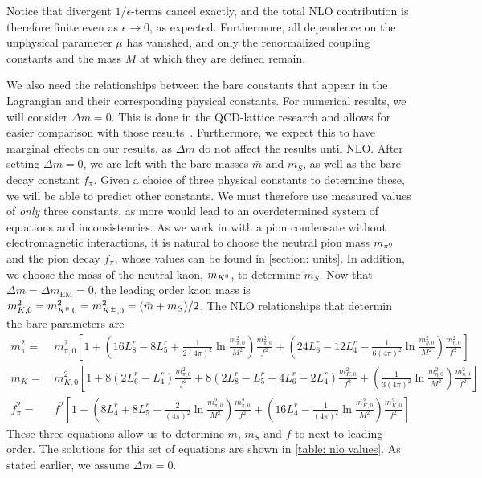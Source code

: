 Notice that divergent $1/\epsilon$-terms cancel exactly, and the total NLO contribution is therefore finite even as $\epsilon\rightarrow 0$, as expected.
Furthermore, all dependence on the unphysical parameter $\mu$ has vanished, and only the renormalized coupling constants and the mass $M$ at which they are defined remain.

We also need the relationships between the bare constants that appear in the Lagrangian and their corresponding physical constants.
For numerical results, we will consider $\Delta m = 0$.
This is done in the QCD-lattice research and allows for easier comparison with those results~\autocite{brandtNewClassCompact2018}.
Furthermore, we expect this to have marginal effects on our results, as $\Delta m$ do not affect the results until NLO.
After setting $\Delta m = 0$, we are left with the bare masses $\bar m$ and $m_S$, as well as the bare decay constant $f_\pi$.
Given a choice of three physical constants to determine these, we will be able to predict other constants.
We must therefore use measured values of \emph{only} three constants, as more would lead to an overdetermined system of equations and inconsistencies.
As we work in with a pion condensate without electromagnetic interactions, it is natural to choose the neutral pion mass $m_{\pi^0}$ and the pion decay $f_\pi$, whose values can be found in \autoref{section: units}.
In addition, we choose the mass of the neutral kaon, $m_{{K^0}}$, to determine $m_S$.
Now that $\Delta m = \Delta m_\text{EM} = 0$, the leading order kaon mass is $m_{K,0}^2 = m_{{K^0},0}^2 = m_{{K^\pm},0}^2 = (\bar m + m_S)/2$.
The NLO relationships that determin the bare parameters are~\autocite{gasserChiralPerturbationTheory1985}
%
\begin{align}
    m_\pi^2 
    =&\, 
    m_{\pi,0}^2
    \left[
        1
        +
        \left(
            16L_8^r - 8L_5^r
            +
            \frac{1}{2(4\pi)^2}
            \ln\frac{m_{\pi,0}^2}{M^2}
        \right)\frac{m_{\pi,0}^2}{f^2}
        +
        \left(
            24L_6^r - 12L_4^r
            -
            \frac{1}{6(4\pi)^2}
            \ln\frac{m_{\eta,0}^2}{M^2}
        \right)\frac{m_{\eta,0}^2}{f^2}
    \right] \\
    m_{K}
    =&\,
    m_{K,0}^2
    \left[
        1
        + 8\left(2L_6^r - L_4^r\right) \frac{m_{\pi,0}^2}{f^2}
        + 8\left(2L_8^r - L_5^r + 4L_6^r- 2L_4^r\right) \frac{m_{K,0}^2}{f^2}
        +
        \left(        
            \frac{1}{3(4 \pi)^2} 
            \ln\frac{m_{\eta,0}^2}{M^2}
        \right)
        \frac{m_{\eta,0}^2}{f^2}
    \right]\\
    f_\pi^2
    =&\, f^2
    \left[
        1
        + 
        \left(
            8 L_4^r + 8 L_5^r - \frac{2}{(4\pi)^2} \ln\frac{m_{\pi,0}^2}{M^2}
        \right) \frac{m_{\pi,0}^2}{f^2}
        +
        \left(
            16 L_4^r
            - \frac{1}{(4\pi)^2} \ln\frac {m_{K,0}^2}{M^2}
        \right) \frac{m_{K,0}^2}{f^2}
    \right]
\end{align}
%
These three equations allow us to determine $\bar m$, $m_S$ and $f$ to next-to-leading order.
The solutions for this set of equations are shown in \autoref{table: nlo values}.
As stated earlier, we assume $\Delta m = 0$.

